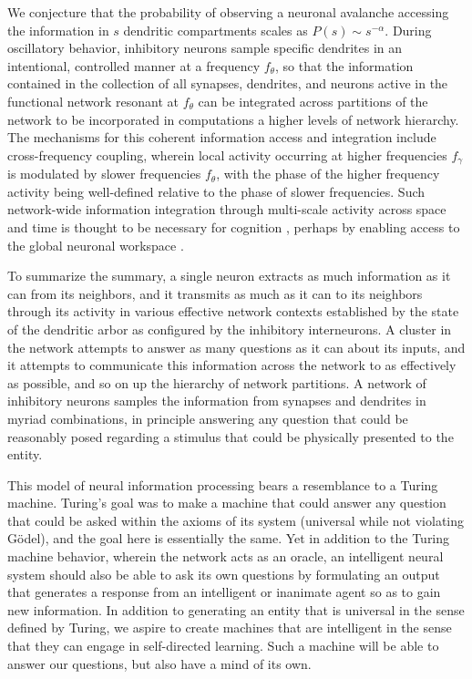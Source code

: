 \documentclass[twocolumn]{article}
\begin{document}
We conjecture that the probability of observing a neuronal avalanche accessing the information in $s$ dendritic compartments scales as $P(s)\sim s^{-\alpha}$. During oscillatory behavior, inhibitory neurons sample specific dendrites in an intentional, controlled manner at a frequency $f_{\theta}$, so that the information contained in the collection of all synapses, dendrites, and neurons active in the functional network resonant at $f_{\theta}$ can be integrated across partitions of the network to be incorporated in computations a higher levels of network hierarchy. The mechanisms for this coherent information access and integration include cross-frequency coupling, wherein local activity occurring at higher frequencies $f_{\gamma}$ is modulated by slower frequencies $f_{\theta}$, with the phase of the higher frequency activity being well-defined relative to the phase of slower frequencies. Such network-wide information integration through multi-scale activity across space and time is thought to be necessary for cognition \cite{bu2006}, perhaps by enabling access to the global neuronal workspace \cite{ba1988,de2014}.

To summarize the summary, a single neuron extracts as much information as it can from its neighbors, and it transmits as much as it can to its neighbors through its activity in various effective network contexts established by the state of the dendritic arbor as configured by the inhibitory interneurons. A cluster in the network attempts to answer as many questions as it can about its inputs, and it attempts to communicate this information across the network to as effectively as possible, and so on up the hierarchy of network partitions. A network of inhibitory neurons samples the information from synapses and dendrites in myriad combinations, in principle answering any question that could be reasonably posed regarding a stimulus that could be physically presented to the entity. 

This model of neural information processing bears a resemblance to a Turing machine. Turing's goal was to make a machine that could answer any question that could be asked within the axioms of its system (universal while not violating G\"{o}del), and the goal here is essentially the same. Yet in addition to the Turing machine behavior, wherein the network acts as an oracle, an intelligent neural system should also be able to ask its own questions by formulating an output that generates a response from an intelligent or inanimate agent so as to gain new information. In addition to generating an entity that is universal in the sense defined by Turing, we aspire to create machines that are intelligent in the sense that they can engage in self-directed learning. Such a machine will be able to answer our questions, but also have a mind of its own.
\end{document}
